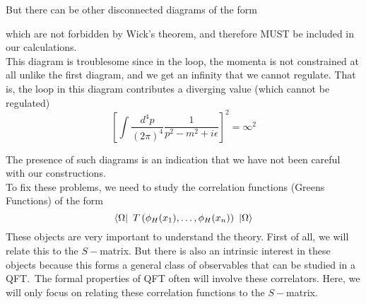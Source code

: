 \documentclass[11pt, notitlepage]{report}
\numberwithin{equation}{section}
\begin{document}
But there can be other disconnected diagrams of the form 
\begin{figure}[h]
    \centering
\end{figure}

which are not forbidden by Wick's theorem, and therefore MUST be included in our calculations.\\

This diagram is troublesome since in the loop, the momenta is not constrained at all unlike the first diagram, and we get an infinity that we cannot regulate. That is, the loop in this diagram contributes a diverging value (which cannot be regulated)
\begin{equation*}
    \left[ \int \frac{d^4 p}{(2\pi)^4} \frac{1}{p^2 - m^2 + i\epsilon}    \right]^2 = \infty^2
\end{equation*}

The presence of such diagrams is an indication that we have not been careful with our constructions.\\

To fix these problems, we need to study the correlation functions (Greens Functions) of the form 
\begin{equation*}
    \bra{\Omega} ~T\left( \phi_H(x_1),\ldots,\phi_H(x_n)  \right)~ \ket{\Omega}
\end{equation*}
These objects are very important to understand the theory. First of all, we will relate this to the \(S-\)matrix. But there is also an intrinsic interest in these objects because this forms a general class of observables that can be studied in a QFT.\ The formal properties of QFT often will involve these correlators. Here, we will only focus on relating these correlation functions to the \(S-\)matrix.
\end{document}
